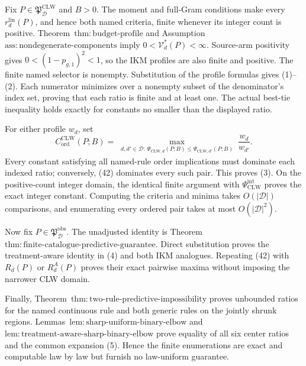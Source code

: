 Fix \(P\in\mathfrak P_{\mathcal D}^{\mathrm{CLW}}\) and \(B>0\).  The moment and full-Gram conditions make every \(r_d^{\mathrm{lin}}(P)\), and hence both named criteria, finite whenever its integer count is positive.  Theorem~\(\mathrm{thm{:}budget\text{-}profile}\) and Assumption~\(\mathrm{ass{:}nondegenerate\text{-}components}\) imply \(0<\mathcal V_d^*(P)<\infty\).  Source-arm positivity gives \(0<(1-p_{g,1})^2<1\), so the IKM profiles are also finite and positive.  The finite named selector is nonempty.  Substitution of the profile formulas gives (1)--(2).  Each numerator minimizes over a nonempty subset of the denominator's index set, proving that each ratio is finite and at least one.  The actual best-tie inequality holds exactly for constants no smaller than the displayed ratio.

For either profile \(w_d\), set
\[
 C_{\mathrm{ord}}^{\mathrm{CLW}}(P;B)
 =\max_{\substack{d,d'\in\mathcal D:\,
 \Psi_{\mathrm{CLW},d}(P;B)
 \le\Psi_{\mathrm{CLW},d'}(P;B)}}\frac{w_d}{w_{d'}}.       \tag{42}
\]
Every constant satisfying all named-rule order implications must dominate each indexed ratio; conversely, (42) dominates every such pair.  This proves (3).  On the positive-count integer domain, the identical finite argument with \(\Psi_{\mathrm{CLW}}^{\mathrm{int}}\) proves the exact integer constant.  Computing the criteria and minima takes \(O(|\mathcal D|)\) comparisons, and enumerating every ordered pair takes at most \(O(|\mathcal D|^2)\).

Now fix \(P\in\mathfrak P_{\mathcal D}^{\mathrm{obs}}\).  The unadjusted identity is Theorem~\(\mathrm{thm{:}finite\text{-}catalogue\text{-}predictive\text{-}guarantee}\).  Direct substitution proves the treatment-aware identity in (4) and both IKM analogues.  Repeating (42) with \(R_d(P)\) or \(R_d^A(P)\) proves their exact pairwise maxima without imposing the narrower CLW domain.

Finally, Theorem~\(\mathrm{thm{:}two\text{-}rule\text{-}predictive\text{-}impossibility}\) proves unbounded ratios for the named continuous rule and both generic rules on the jointly shrunk regions.  Lemmas~\(\mathrm{lem{:}sharp\text{-}uniform\text{-}binary\text{-}elbow}\) and \(\mathrm{lem{:}treatment\text{-}aware\text{-}sharp\text{-}binary\text{-}elbow}\) prove equality of all six center ratios and the common expansion (5).  Hence the finite enumerations are exact and computable law by law but furnish no law-uniform guarantee.